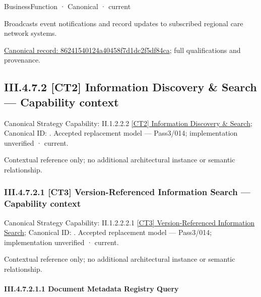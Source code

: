 \label{element:86241540124a40458f7d1dc2f5df84ca}
{\small BusinessFunction · Canonical · current}\par

Broadcasts event notifications and record updates to subscribed regional care network systems.


{\footnotesize \href{../../../../../../../../continuum/business/business-function/86241540124a40458f7d1dc2f5df84ca.md}{Canonical record: 86241540124a40458f7d1dc2f5df84ca}; full qualifications and provenance.}\par
\subsection*{III.4.7.2 [CT2] Information Discovery \& Search — Capability context}
\label{navigation:III.4.7.2}

{\small Canonical Strategy Capability: II.1.2.2.2 \hyperref[element:6621b9a124d7444aa83793810531c388]{[CT2] Information Discovery \& Search}; Canonical ID: \texttt{}. Accepted replacement model — Pass3/014; implementation unverified · current.}\par
Contextual reference only; no additional architectural instance or semantic relationship.\par
\subsubsection*{III.4.7.2.1 [CT3] Version-Referenced Information Search — Capability context}
\label{navigation:III.4.7.2.1}

{\small Canonical Strategy Capability: II.1.2.2.2.1 \hyperref[element:1fb53b4061d04732822c496602c9df6c]{[CT3] Version-Referenced Information Search}; Canonical ID: \texttt{}. Accepted replacement model — Pass3/014; implementation unverified · current.}\par
Contextual reference only; no additional architectural instance or semantic relationship.\par
\paragraph*{III.4.7.2.1.1 Document Metadata Registry Query}
\label{navigation:III.4.7.2.1.1}

